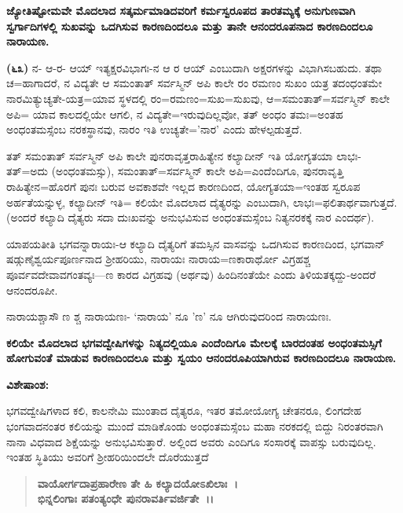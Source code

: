\begin{center}
\textbf{ಜ್ಯೋತಿಷ್ಟೋಮವೇ ಮೊದಲಾದ ಸತ್ಕರ್ಮಮಾಡಿದವರಿಗೆ ಕರ್ಮಸ್ವರೂಪದ ತಾರತಮ್ಯಕ್ಕೆ ಅನುಗುಣವಾಗಿ ಸ್ವರ್ಗಾದಿಗಳಲ್ಲಿ ಸುಖವನ್ನು ಒದಗಿಸುವ ಕಾರಣದಿಂದಲೂ ಮತ್ತು ತಾನೇ ಆನಂದರೂಪನಾದ ಕಾರಣದಿಂದಲೂ ನಾರಾಯಣ.}
\end{center}

\textbf{(೬೩)} ನ- ಆ-ರ- ಆಯ್ ಇತ್ಯಕ್ಷರವಿಭಾಗಃ-ನ ಆ ರ ಆಯ್ ಎಂಬುದಾಗಿ ಅಕ್ಷರಗಳನ್ನು ವಿಭಾಗಿಸಬಹುದು. ತಥಾ ಚ=ಹಾಗಾದರೆ, ನ ವಿದ್ಯತೇ ಆ ಸಮಂತಾತ್ ಸರ್ವಸ್ಮಿನ್ ಅಪಿ ಕಾಲೇ ರಂ ರಮಣಂ ಸುಖಂ ಯತ್ರ ತದಂಧಂತಮೇ ನಾರಮಿತ್ಯುಚ್ಯತೇ-ಯತ್ರ=ಯಾವ ಸ್ಥಳದಲ್ಲಿ ರಂ=ರಮಣಂ=ಸುಖ=ಸುಖವು, ಆ=ಸಮಂತಾತ್=ಸರ್ವಸ್ಮಿನ್ ಕಾಲೇ ಅಪಿ= ಯಾವ ಕಾಲದಲ್ಲಿಯೇ ಆಗಲಿ, ನ ವಿದ್ಯತೇ=ಇರುವುದಿಲ್ಲವೋ, ತತ್ ಅಂಧಂ ತಮಃ=ಅಂತಹ ಅಂಧಂತಮಸ್ಸೆಂಬ ನರಕಸ್ಥಾನವು, ನಾರಂ ಇತಿ ಉಚ್ಯತೇ='ನಾರ' ಎಂದು ಹೇಳಲ್ಪಡುತ್ತದೆ.

ತತ್ ಸಮಂತಾತ್ ಸರ್ವಸ್ಮಿನ್ ಅಪಿ ಕಾಲೇ ಪುನರಾವೃತ್ತರಾಹಿತ್ಯೇನ ಕಲ್ಯಾದೀನ್ ಇತಿ ಯೋಗ್ಯತಯಾ ಲಾಭಃ-ತತ್=ಅದು (ಅಂಧಂತಮಸ್ಸು), ಸಮಂತಾತ್=ಸರ್ವಸ್ಮಿನ್ ಕಾಲೇ ಅಪಿ=ಎಂದೆಂದಿಗೂ, ಪುನರಾವೃತ್ತಿ ರಾಹಿತ್ಯೇನ=ಹೊರಗೆ ಪುನಃ ಬರುವ ಅವಕಾಶವೇ ಇಲ್ಲದ ಕಾರಣದಿಂದ, ಯೋಗ್ಯತಯಾ=ಇಂತಹ ಸ್ವರೂಪ ಅರ್ಹತೆಯನ್ನುಳ್ಳ, ಕಲ್ಯಾದೀನ್ ಇತಿ= ಕಲಿಯೇ ಮೊದಲಾದ ದೈತ್ಯರನ್ನು ಎಂಬುದಾಗಿ, ಲಾಭಃ=ಫಲಿತಾರ್ಥವಾಗುತ್ತದೆ. (ಅಂದರೆ ಕಲ್ಯಾದಿ ದೈತ್ಯರು ಸದಾ ದುಃಖವನ್ನು ಅನುಭವಿಸುವ ಅಂಧಂತಮಸ್ಸೆಂಬ ನಿತ್ಯನರಕಕ್ಕೆ ನಾರ ಎಂದರ್ಥ).

ಯಾಪಯತೀತಿ ಭಗವನ್ನಾರಾಯಃ-ಆ ಕಲ್ಯಾದಿ ದೈತ್ಯರಿಗೆ ತಮಸ್ಸಿನ ವಾಸವನ್ನು ಒದಗಿ\-ಸುವ ಕಾರಣದಿಂದ, ಭಗವಾನ್ ಷಡ್ಗುಣೈಶ್ವರ್ಯಪೂರ್ಣನಾದ ಶ‍್ರೀಹರಿಯು, ನಾರಾಯಃ ನಾರಾಯ=ಣಕಾರಾರ್ಥೋ ವಿಗ್ರಹಶ್ಚ ಪೂರ್ವವದೇವಾವಗಂತವ್ಯಃ—ಣ ಕಾರದ ವಿಗ್ರಹವು (ಅರ್ಥವು) ಹಿಂದಿನಂತೆಯೇ ಎಂದು ತಿಳಿಯತಕ್ಕದ್ದು-ಅಂದರೆ ಆನಂದರೂಪೀ.

ನಾರಾಯಶ್ಚಾಸೌ ಣ ಶ್ಚ ನಾರಾಯಣಃ- `ನಾರಾಯ' ನೂ 'ಣ' ನೂ ಆಗಿರುವುದರಿಂದ ನಾರಾಯಣಃ.

\begin{center}
\textbf{ಕಲಿಯೇ ಮೊದಲಾದ ಭಗವದ್ವೇಷಿಗಳನ್ನು ನಿತ್ಯದಲ್ಲಿಯೂ ಎಂದೆಂದಿಗೂ ಮೇಲಕ್ಕೆ ಬಾರದಂತಹ ಅಂಧಂತಮಸ್ಸಿಗೆ ಹೋಗುವಂತೆ ಮಾಡುವ ಕಾರಣದಿಂದಲೂ ಮತ್ತು ಸ್ವಯಂ ಆನಂದರೂಪಿಯಾಗಿರುವ ಕಾರಣದಿಂದಲೂ ನಾರಾಯಣ.}
\end{center}

\noindent
\textbf{ವಿಶೇಷಾಂಶ:\enginline{-}}

ಭಗವದ್ವೇಷಿಗಳಾದ ಕಲಿ, ಕಾಲನೇಮಿ ಮುಂತಾದ ದೈತ್ಯರೂ, ಇತರ ತಮೋಯೋಗ್ಯ ಚೇತನರೂ, ಲಿಂಗದೇಹ ಭಂಗವಾದನಂತರ ಕಲಿಯನ್ನು ಮುಂದೆ ಮಾಡಿಕೊಂಡು ಅಂಧಂತಮ\-ಸ್ಸೆಂಬ ಮಹಾ ನರಕದಲ್ಲಿ ಬಿದ್ದು ನಿರಂತರವಾಗಿ ನಾನಾ ವಿಧವಾದ ಶಿಕ್ಷೆಯನ್ನು ಅನುಭವಿಸುತ್ತಾರೆ. ಅಲ್ಲಿಂದ ಅವರು ಎಂದಿಗೂ ಸಂಸಾರಕ್ಕೆ ವಾಪಸ್ಸು ಬರುವುದಿಲ್ಲ. ಇಂತಹ ಸ್ಥಿತಿಯು ಅವರಿಗೆ ಶ‍್ರೀಹರಿಯಿಂದಲೇ ದೊರೆಯುತ್ತದೆ

\begin{verse}
\textbf{ವಾಯೋರ್ಗದಾಪ್ರಹಾರೇಣ ತೇ ಹಿ ಕಲ್ಯಾದಯೋಽಖಿಲಾಃ~।}\\\textbf{ಭಿನ್ನಲಿಂಗಾಃ ಪತಂತ್ಯಂಧೇ ಪುನರಾವರ್ತಿವರ್ಜಿತೇ~।।}
\end{verse}

\vskip -4pt

